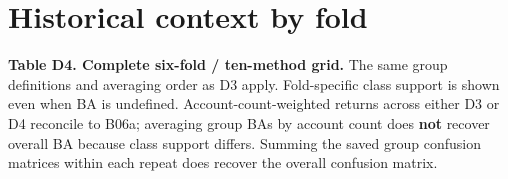 \section{Historical context by fold}\label{s:eaebcfa8ca357c5f}

\textbf{Table D4. Complete six-fold / ten-method grid.} The same group
definitions and averaging order as D3 apply. Fold-specific class support
is shown even when BA is undefined. Account-count-weighted returns across
either D3 or D4 reconcile to B06a; averaging group BAs by account count
does \textbf{not} recover overall BA because class support differs. Summing
the saved group confusion matrices within each repeat does recover the
overall confusion matrix.

\begin{landscape}
\begingroup
\fontsize{9}{11}\selectfont
{}
\setlength{\tabcolsep}{3pt}


\end{landscape}
